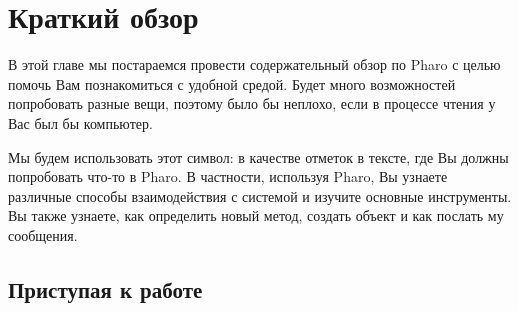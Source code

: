\documentclass[a4paper,10pt,twoside]{book}
\begin{document}
	\sloppy
\fi
\newcommand{\clover}{%
	\raisebox{-0.8ex}[0pt][0pt]{%
		\texttt{[image: cloverleafKey]}}}
\chapter{Краткий обзор \pharo}


В этой главе мы постараемся провести содержательный обзор по Pharo
с целью помочь Вам познакомиться с удобной средой.
Будет много возможностей попробовать разные вещи,
поэтому было бы неплохо,
если в процессе чтения у Вас был бы компьютер. 


Мы будем использовать этот символ: \dothisicon{} в качестве отметок
в тексте, где Вы должны попробовать что-то в Pharo.
В частности,  используя Pharo, Вы узнаете различные способы
взаимодействия с системой и изучите основные инструменты.
Вы также узнаете, как определить новый метод, создать
объект и как послать му сообщения. 

\section{Приступая к работе}

\end{document}
